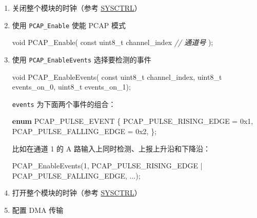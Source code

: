 \documentclass[
  12pt,
]{book}
\newenvironment{Shaded}{\begin{snugshade}}{\end{snugshade}}
\newcommand{\BaseNTok}[1]{\textcolor[rgb]{0.00,0.00,0.81}{#1}}
\newcommand{\CommentTok}[1]{\textcolor[rgb]{0.56,0.35,0.01}{\textit{#1}}}
\newcommand{\DataTypeTok}[1]{\textcolor[rgb]{0.13,0.29,0.53}{#1}}
\newcommand{\DecValTok}[1]{\textcolor[rgb]{0.00,0.00,0.81}{#1}}
\newcommand{\KeywordTok}[1]{\textcolor[rgb]{0.13,0.29,0.53}{\textbf{#1}}}
\newcommand{\NormalTok}[1]{#1}
\begin{document}
\begin{enumerate}
\def\labelenumi{\arabic{enumi}.}
\item
  关闭整个模块的时钟（参考 \protect\hyperlink{ch-sysctrl}{SYSCTRL}）
\item
  使用 \texttt{PCAP\_Enable} 使能 PCAP 模式

\begin{Shaded}
\begin{Highlighting}[]
\DataTypeTok{void}\NormalTok{ PCAP_Enable(}
    \DataTypeTok{const} \DataTypeTok{uint8_t}\NormalTok{ channel_index     }\CommentTok{// 通道号}
\NormalTok{);}
\end{Highlighting}
\end{Shaded}
\item
  使用 \texttt{PCAP\_EnableEvents} 选择要检测的事件

\begin{Shaded}
\begin{Highlighting}[]
\DataTypeTok{void}\NormalTok{ PCAP_EnableEvents(}
    \DataTypeTok{const} \DataTypeTok{uint8_t}\NormalTok{ channel_index,}
    \DataTypeTok{uint8_t}\NormalTok{ events_on_0,}
    \DataTypeTok{uint8_t}\NormalTok{ events_on_1);}
\end{Highlighting}
\end{Shaded}

  \texttt{events} 为下面两个事件的组合：

\begin{Shaded}
\begin{Highlighting}[]
\KeywordTok{enum}\NormalTok{ PCAP_PULSE_EVENT}
\NormalTok{\{}
\NormalTok{    PCAP_PULSE_RISING_EDGE  = }\BaseNTok{0x1}\NormalTok{,}
\NormalTok{    PCAP_PULSE_FALLING_EDGE = }\BaseNTok{0x2}\NormalTok{,}
\NormalTok{\};}
\end{Highlighting}
\end{Shaded}

  比如在通道 1 的 A 路输入上同时检测、上报上升沿和下降沿：

\begin{Shaded}
\begin{Highlighting}[]
\NormalTok{PCAP_EnableEvents(}\DecValTok{1}\NormalTok{,}
\NormalTok{    PCAP_PULSE_RISING_EDGE}
\NormalTok{    | PCAP_PULSE_FALLING_EDGE,}
\NormalTok{    ...);}
\end{Highlighting}
\end{Shaded}
\item
  打开整个模块的时钟（参考 \protect\hyperlink{ch-sysctrl}{SYSCTRL}）
\item
  配置 DMA 传输


\end{enumerate}
\end{document}
